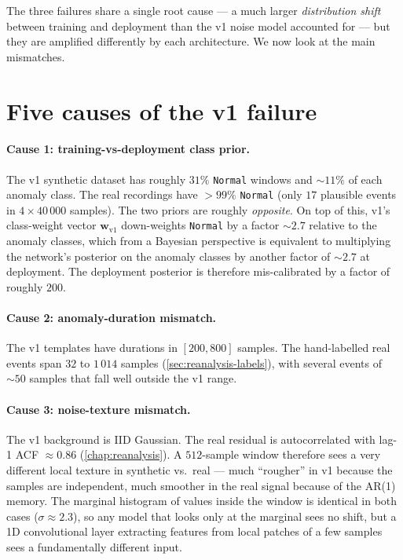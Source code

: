 The three failures share a single root cause --- a much larger
\emph{distribution shift} between training and deployment than the v1
noise model accounted for --- but they are amplified differently by
each architecture. We now look at the main mismatches.

\section{Five causes of the v1 failure}
\label{sec:v1-fail-causes}

\paragraph{Cause 1: training-vs-deployment class prior.} The v1
synthetic dataset has roughly $31\%$ \texttt{Normal} windows and
$\sim 11\%$ of each anomaly class. The real recordings have
$> 99\%$ \texttt{Normal} (only $17$ plausible events in
$4 \times 40\,000$ samples). The two priors are roughly
\emph{opposite}. On top of this, v1's class-weight vector
$\mathbf{w}_{\text{v1}}$ down-weights \texttt{Normal} by a factor
$\sim 2.7$ relative to the anomaly classes, which from a Bayesian
perspective is equivalent to multiplying the network's posterior on
the anomaly classes by another factor of $\sim 2.7$ at deployment.
The deployment posterior is therefore mis-calibrated by a factor of
roughly $200$.

\paragraph{Cause 2: anomaly-duration mismatch.} The v1 templates have
durations in $[200, 800]$ samples. The hand-labelled real events span
$32$ to $1\,014$ samples (\cref{sec:reanalysis-labels}), with several
events of $\sim 50$ samples that fall well outside the v1 range.

\paragraph{Cause 3: noise-texture mismatch.} The v1 background is IID
Gaussian. The real residual is autocorrelated with lag-1 ACF $\approx
0.86$ (\cref{chap:reanalysis}). A $512$-sample window therefore sees a
very different local texture in synthetic vs.\ real --- much
``rougher'' in v1 because the samples are independent, much smoother in
the real signal because of the AR(1) memory. The marginal histogram
of values inside the window is identical in both cases ($\sigma \approx
2.3$), so any model that looks only at the marginal sees no shift, but
a 1D convolutional layer extracting features from local patches of a
few samples sees a fundamentally different input.

